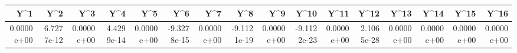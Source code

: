 \begin{tabular}{rrrrrrrrrrrrrrrr}
\toprule
       Y\textasciicircum 1 &        Y\textasciicircum 2 &        Y\textasciicircum 3 &        Y\textasciicircum 4 &        Y\textasciicircum 5 &         Y\textasciicircum 6 &        Y\textasciicircum 7 &         Y\textasciicircum 8 &        Y\textasciicircum 9 &        Y\textasciicircum 10 &       Y\textasciicircum 11 &       Y\textasciicircum 12 &       Y\textasciicircum 13 &       Y\textasciicircum 14 &       Y\textasciicircum 15 &       Y\textasciicircum 16 \\
\midrule
0.0000e+00 & 6.7277e-12 & 0.0000e+00 & 4.4299e-14 & 0.0000e+00 & -9.3278e-15 & 0.0000e+00 & -9.1121e-19 & 0.0000e+00 & -9.1122e-23 & 0.0000e+00 & 2.1065e-28 & 0.0000e+00 & 0.0000e+00 & 0.0000e+00 & 0.0000e+00 \\
\bottomrule
\end{tabular}
